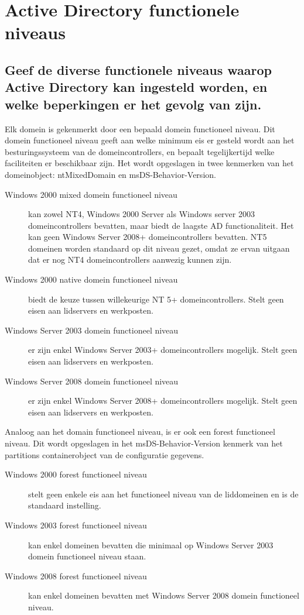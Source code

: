 \chapter{Active Directory functionele niveaus}

\section{Geef de diverse functionele niveaus waarop Active Directory kan
ingesteld worden, en welke beperkingen er het gevolg van zijn.}

Elk domein is gekenmerkt door een bepaald domein functioneel niveau. Dit domein
functioneel niveau geeft aan welke minimum eis er gesteld wordt aan het
besturingssysteem van de domeincontrollers, en bepaalt tegelijkertijd welke
faciliteiten er beschikbaar zijn. Het wordt opgeslagen in twee kenmerken van het
domeinobject: ntMixedDomain en msDS-Behavior-Version.
\begin{description}
	\item[Windows 2000 mixed domein functioneel niveau] kan zowel NT4,
		Windows 2000 Server als Windows server 2003 domeincontrollers
		bevatten, maar biedt de laagste AD functionaliteit. Het kan geen
		Windows Server 2008+ domeincontrollers bevatten. NT5 domeinen
		worden standaard op dit niveau gezet, omdat ze ervan uitgaan dat
		er nog NT4 domeincontrollers aanwezig kunnen zijn.
	\item[Windows 2000 native domein functioneel niveau] biedt de keuze
		tussen willekeurige NT 5+ domeincontrollers. Stelt geen eisen
		aan lidservers en werkposten.
	\item[Windows Server 2003 domein functioneel niveau] er zijn enkel
		Windows Server 2003+ domeincontrollers mogelijk. Stelt geen
		eisen aan lidservers en werkposten.
	\item[Windows Server 2008 domein functioneel niveau] er zijn enkel
		Windows Server 2008+ domeincontrollers mogelijk. Stelt geen
		eisen aan lidservers en werkposten.
\end{description}

Analoog aan het domain functioneel niveau, is er ook een forest functioneel
niveau. Dit wordt opgeslagen in het msDS-Behavior-Version kenmerk van het
partitions containerobject van de configuratie gegevens.
\begin{description}
	\item[Windows 2000 forest functioneel niveau] stelt geen enkele eis aan
		het functioneel niveau van de liddomeinen en is de standaard
		instelling.
	\item[Windows 2003 forest functioneel niveau] kan enkel domeinen
		bevatten die minimaal op Windows Server 2003 domein functioneel
		niveau staan.
	\item[Windows 2008 forest functioneel niveau] kan enkel domeinen
		bevatten met Windows Server 2008 domein functioneel niveau.
\end{description}

